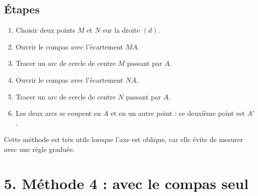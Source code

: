 \documentclass[11pt,a4paper]{article}
\begin{document}
\subsection*{Étapes}

\begin{enumerate}[label=\textbf{Étape \arabic* :}]
    \item Choisir deux points $M$ et $N$ sur la droite $(d)$.
    \item Ouvrir le compas avec l'écartement $MA$.
    \item Tracer un arc de cercle de centre $M$ passant par $A$.
    \item Ouvrir le compas avec l'écartement $NA$.
    \item Tracer un arc de cercle de centre $N$ passant par $A$.
    \item Les deux arcs se coupent en $A$ et en un autre point : ce deuxième point est $A'$.
\end{enumerate}

\begin{center}
\end{center}

\begin{retenir}
Cette méthode est très utile lorsque l'axe est oblique, car elle évite de mesurer avec une règle graduée.
\end{retenir}

\section*{5. Méthode 4 : avec le compas seul}
\end{document}
